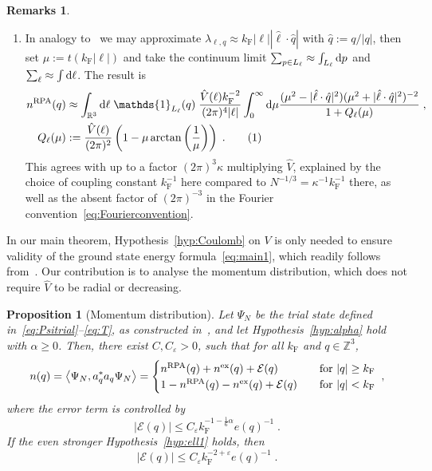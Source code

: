 \documentclass[12pt,a4paper]{article}
\numberwithin{equation}{section}
\newcommand{\cE}{\mathcal{E}}
\newcommand{\1}{\mathbb{I}}
\newcommand{\di}{\textnormal{d}}
\newcommand{\ex}{\mathrm{ex}}
\newcommand{\F}{\mathrm{F}}
\newcommand{\RPA}{\mathrm{RPA}}
\newcommand{\tagg}[1]{ \stepcounter{equation} \tag{\theequation}
\label{#1} } %
\newcommand{\R}{\mathbb{R}}
\newcommand{\Z}{\mathbb{Z}}
\newcommand{\eva}[1]{\left\langle #1 \right\rangle}
\theoremstyle{plain}
\newtheorem{proposition}[theorem]{Proposition}
\theoremstyle{definition}
\newtheorem*{remarks}{Remarks}
\theoremstyle{remark}
\theoremstyle{plain}
\theoremstyle{definition}
\theoremstyle{remark}
\begin{document}
\begin{remarks}
\begin{enumerate}
\item In analogy to~\cite[Section~1.1]{BL25} we may approximate $ \lambda_{\ell,q} \approx k_{\F} |\ell| |\hat{\ell} \cdot \hat{q}| $ with $ \hat{q} := {q}/{|q|} $, then set $ \mu := t (k_{\F} |\ell|) $ and take the continuum limit $ \sum_{p \in L_\ell} \approx \int_{L_\ell} \di p $ and $ \sum_\ell \approx \int \di \ell $. The result is
\begin{align*}
	n^{\RPA}(q)
	&\approx \int_{\R^3} \di \ell \; \mathds{1}_{L_{\ell}}(q) \; \frac{\hat{V}(\ell) k_{\F}^{-2}}{(2 \pi)^4 |\ell|}
		\int_0^\infty \di \mu \frac{(\mu^2-|\hat{\ell} \cdot \hat{q}|^2) (\mu^2 + |\hat{\ell} \cdot \hat{q}|^2)^{-2}}{1 + Q_\ell(\mu)} \;, \\
	Q_\ell(\mu) &:= \frac{\hat{V}(\ell)}{(2 \pi)^2} \left( 1 - \mu \arctan \left( \frac{1}{\mu} \right) \right) \;. \tagg{eq:Q}
\end{align*}
This agrees with \cite{BL25} up to a factor $ (2 \pi)^3 \kappa $ multiplying $\hat{V}$, explained by the choice of coupling constant $k_\F^{-1}$ here compared to $N^{-1/3} = \kappa^{-1} k_{\F}^{-1}$ there, as well as the absent factor of $ (2 \pi)^{-3} $ in the Fourier convention~\eqref{eq:Fourierconvention}.
\end{enumerate}
\end{remarks}



In our main theorem, Hypothesis~\ref{hyp:Coulomb} on $ V $ is only needed to ensure validity of the ground state energy formula~\eqref{eq:main1}, which readily follows from~\cite{CHN23,CHN24}. Our contribution is to analyse the momentum distribution, which does not require $\hat{V} $ to be radial or decreasing.

\begin{proposition}[Momentum distribution] \label{prop:main}
Let $ \Psi_N $ be the trial state defined in~\eqref{eq:Psitrial}--\eqref{eq:T}, as constructed in~\cite{CHN23}, and let Hypothesis~\ref{hyp:alpha} hold with $ \alpha \ge 0 $. Then, there exist $ C, C_\varepsilon > 0 $, such that for all $ k_{\F} $ and $ q \in \Z^3 $,
\begin{equation} \label{eq:main_prop_2}
	n(q) = \eva{\Psi_N, a_q^* a_q \Psi_N}
	= \begin{cases}
	n^{\RPA}(q) + n^{\ex}(q) + \cE(q) & \quad
		\textnormal{for } |q| \ge k_{\F} \\
	1 - n^{\RPA}(q) - n^{\ex}(q) + \cE(q) & \quad
		\textnormal{for } |q| < k_{\F} 
	\end{cases} \;,
\end{equation}
where the error term is controlled by
\begin{equation}
	\lvert \cE(q)\rvert \le C_\varepsilon k_{\F}^{-1 - \frac 16 \alpha} e(q)^{-1} \;.
\end{equation}
If the even stronger Hypothesis~\ref{hyp:ell1} holds, then
\begin{equation} \label{eq:main_prop_improvederror}
	\lvert \cE(q)\rvert \le C_\varepsilon k_{\F}^{-2 +\varepsilon} e(q)^{-1} \;.
\end{equation}
\end{proposition}
\end{document}
